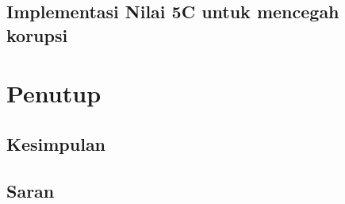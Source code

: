 \documentclass[11pt]{article}
\begin{document}
\subsection{Implementasi Nilai 5C untuk mencegah korupsi}


\newpage
\section{Penutup}
    \subsection{Kesimpulan}
    \subsection{Saran}


\newpage


\end{document}
